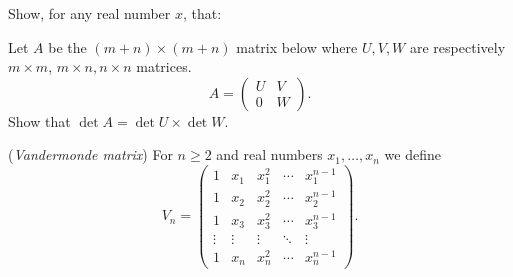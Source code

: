 \documentclass[answers]{exam}
\begin{document}
\begin{questions}
\question%
Show, for any real number $x$, that:
\begin{parts}
\part%
\[
	\begin{vmatrix}
		x^{2} & (x+1)^{2} & (x+2)^{2} \\
		(x+1)^{2} & (x+2)^{2} & (x+3)^{2} \\
		(x+2)^{2} & (x+3)^{2} & (x+4)^{2}
	\end{vmatrix}=-8;
\]

\part%
\[
	\begin{vmatrix}
		1 & 1 & 1 & 1 \\
		x & 1 & 1 & 1 \\
		x & x & 1 & 1 \\
		x & x & x & 1
	\end{vmatrix}=(1-x)^{3}.
\]
\end{parts}



\question%
Let $A$ be the $(m+n) \times(m+n)$ matrix below where $U, V, W$ are respectively $m \times m$, $m \times n, n \times n$ matrices. \[
	A=\begin{pmatrix}
		U & V \\
		0 & W
	\end{pmatrix}.
\] Show that $\det A=\det U \times \det W$.



\question%
(\emph{Vandermonde matrix}) For $n \geqslant 2$ and real numbers $x_{1}, \ldots, x_{n}$ we define \[
	V_{n}=\begin{pmatrix}
		1 & x_{1} & x_{1}^{2} & \cdots & x_{1}^{n-1} \\
		1 & x_{2} & x_{2}^{2} & \cdots & x_{2}^{n-1} \\
		1 & x_{3} & x_{3}^{2} & \cdots & x_{3}^{n-1} \\
		\vdots & \vdots & \vdots & \ddots & \vdots \\
		1 & x_{n} & x_{n}^{2} & \cdots & x_{n}^{n-1}
	\end{pmatrix}.
\]
\end{questions}
\end{document}
